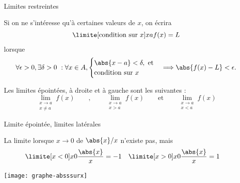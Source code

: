 \begin{frame}{Limites restreintes}
  \begin{definition}
    Si on ne s'intéresse qu'à certaines valeurs de \(x\), on écrira
    \begin{equation*}
      \limite[\text{condition sur \(x\)}] x a f(x) = L
    \end{equation*}
    lorsque
    \begin{equation*}
      \forall \epsilon > 0, \exists \delta > 0~: \forall x \in A,
      \begin{cases}
        \abs{x-a} < \delta, \text{ et}\\
        \text{condition sur \(x\)}
      \end{cases}
      \Longrightarrow \abs{f(x)-L} < \epsilon.
    \end{equation*}
    \begin{example}Les limites \og épointées\fg{}, \og à droite\fg{} et \og à gauche\fg{} sont les suivantes :
      \begin{equation*}
        \lim_{\substack{x \to a\\ x \neq a}} f(x)
        \qquad,\qquad
        \lim_{\substack{x \to a\\ x > a}} f(x)
        \qquad \textrm{et} \qquad
        \lim_{\substack{x \to a\\ x < a}} f(x)
      \end{equation*}
    \end{example}
  \end{definition}
\end{frame}

\begin{frame}{Limite épointée, limites latérales}
  \begin{example}
    La limite lorsque \(x \to 0\) de \(\abs{x}/x\) n'existe pas, mais
    \begin{align*}
      \limite [x<0] x 0 \frac{\abs{x}}{x} &= -1 &       \limite [x>0] x 0 \frac{\abs{x}}{x} &= 1
    \end{align*}

    \begin{center}
      \texttt{[image: graphe-absssurx]}%
    \end{center}
  \end{example}
\end{frame}

